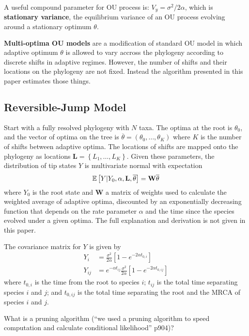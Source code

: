 \documentclass{article}
\def\[{\left [} \def\]{\right ]} \def\({\left (} \def\){\right )}
\begin{document}
A useful compound parameter for OU process is: $V_{y}=\sigma^{2}/2\alpha$, which
is \textbf{stationary variance}, the equilibrium variance of an OU process
evolving around a stationary optimum $\theta$.

\textbf{Multi-optima OU models} are a modification of standard OU model in which
adaptive optimum $\theta$ is allowed to vary accross the phylogeny according to
discrete shifts in adaptive regimes. However, the number of shifts and their
locations on the phylogeny are not fixed. Instead the algorithm presented in
this paper estimates those things.

\subsection{Reversible-Jump Model} Start with a fully resolved phylogeny with
$N$ taxa. The optima at the root is $\theta_0$, and the vector of optima on the
tree is $\overline{\theta}=(\theta_0,\ldots,\theta_{K})$ where $K$ is the number
of shifts between adaptive optima. The locations of shifts are mapped onto the
phylogeny as locations $\mathbf{L}=\left\{ L_{1},\ldots,L_{K} \right\}$. Given
these parameters, the distribution of tip states $Y$ is multivariate normal with
expectation
\begin{equation*} \E\[Y|Y_{0},\alpha,\mathbf{L},\overline{\theta} \]=
\mathbf{W}\overline{\theta}
\end{equation*} where $Y_0$ is the root state and \textbf{W} a matrix of weights
used to calculate the weighted average of adaptive optima, discounted by an
exponentially decreasing function that depends on the rate parameter $\alpha$
and the time since the species evolved under a given optima. The full
explanation and derivation is not given in this paper.

The covariance matrix for $Y$ is given by
\begin{align*} Y_{i} &= \frac{\sigma^{2}}{2\alpha}\left[ 1-e^{-2\alpha t_{0,i}}
\right]\\ Y_{ij} &= e^{-\alpha t_{ij}}\frac{\sigma^{2}}{2\alpha}\left[
1-e^{-2\alpha t_{0,ij}} \right]
\end{align*} where $t_{0,i}$ is the time from the root to species $i$; $t_{ij}$
is the total time separating species $i$ and $j$; and $t_{0,ij}$ is the total
time separating the root and the MRCA of species $i$ and $j$.

What is a pruning algorithm (``we used a pruning algorithm to speed computation
and calculate conditional likelihood'' p904)?
\end{document}
